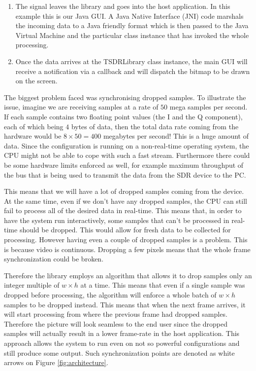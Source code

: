 \documentclass[a4paper,12pt,twoside,openright]{report}
\begin{document}
\begin{enumerate}
	\item The signal leaves the library and goes into the host application. In this example this is our Java GUI. A Java Native Interface (JNI) code marshals the incoming data to a Java friendly format which is then passed to the Java Virtual Machine and the particular class instance that has invoked the whole processing.
	\item Once the data arrives at the TSDRLibrary class instance, the main GUI will receive a notification via a callback and will dispatch the bitmap to be drawn on the screen.
\end{enumerate}

The biggest problem faced was synchronising dropped samples. To illustrate the issue, imagine we are receiving samples at a rate of $50$ mega samples per second. If each sample contains two floating point values (the I and the Q component), each of which being $4$ bytes of data, then the total data rate coming from the hardware would be $8 \times 50 = 400$ megabytes per second! This is a huge amount of data. Since the configuration is running on a non-real-time operating system, the CPU might not be able to cope with such a fast stream. Furthermore there could be some hardware limits enforced as well, for example maximum throughput of the bus that is being used to transmit the data from the SDR device to the PC.

This means that we will have a lot of dropped samples coming from the device. At the same time, even if we don't have any dropped samples, the CPU can still fail to process all of the desired data in real-time. This means that, in order to have the system run interactively, some samples that can't be processed in real-time should be dropped. This would allow for fresh data to be collected for processing. However having even a couple of dropped samples is a problem. This is because video is continuous. Dropping a few pixels means that the whole frame synchronization could be broken.

Therefore the library employs an algorithm that allows it to drop samples only an integer multiple of $w \times h$ at a time. This means that even if a single sample was dropped before processing, the algorithm will enforce a whole batch of $w \times h$ samples to be dropped instead. This means that when the next frame arrives, it will start processing from where the previous frame had dropped samples. Therefore the picture will look seamless to the end user since the dropped samples will actually result in a lower frame-rate in the host application. This approach allows the system to run even on not so powerful configurations and still produce some output. Such synchronization points are denoted as white arrows on Figure \ref{fig:architecture}.
\end{document}

